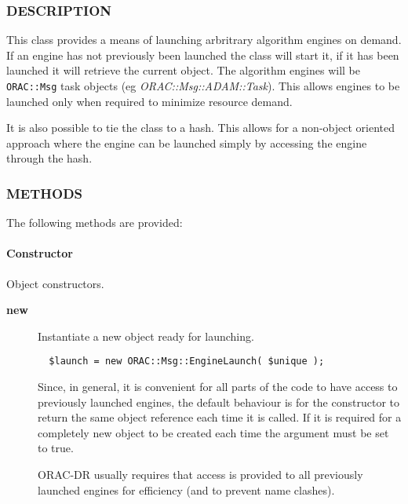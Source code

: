 \subsubsection*{DESCRIPTION\label{ORAC::Msg::EngineLaunch_DESCRIPTION}}


This class provides a means of launching arbritrary algorithm
engines on demand. If an engine has not previously been
launched the class will start it, if it has been launched it
will retrieve the current object. The algorithm engines will
be \texttt{ORAC::Msg} task objects (eg \emph{ORAC::Msg::ADAM::Task}).
This allows engines to be launched only when required to minimize
resource demand.



It is also possible to tie the class to a hash. This allows
for a non-object oriented approach where the engine can be launched
simply by accessing the engine through the hash.

\subsubsection*{METHODS\label{ORAC::Msg::EngineLaunch_METHODS}}


The following methods are provided:

\paragraph*{Constructor\label{ORAC::Msg::EngineLaunch_Constructor}}


Object constructors.

\begin{description}

\item[\textbf{new}] \mbox{}

Instantiate a new object ready for launching.

\begin{verbatim}
  $launch = new ORAC::Msg::EngineLaunch( $unique );
\end{verbatim}


Since, in general, it is convenient for all parts of the code
to have access to previously launched engines, the default
behaviour is for the constructor to return the same object reference
each time it is called. If it is required for a completely new object
to be created each time the argument must be set to true.



ORAC-DR usually requires that access is provided to all previously
launched engines for efficiency (and to prevent name clashes).

\end{description}
